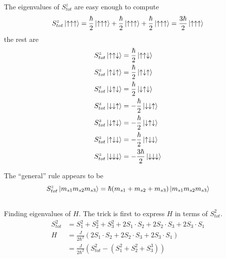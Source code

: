 \documentclass{article}
\begin{document}
The eigenvalues of $S^z_{tot}$ are easy enough to compute
\begin{equation*}
S^z_{tot}\ket{\uparrow\uparrow\uparrow}=\frac{\hbar}{2}\ket{\uparrow\uparrow\uparrow}+\frac{\hbar}{2}\ket{\uparrow\uparrow\uparrow} + \frac{\hbar}{2}\ket{\uparrow\uparrow\uparrow} = \frac{3\hbar}{2}\ket{\uparrow\uparrow\uparrow}
\end{equation*}
the rest are
\begin{align*}
S^z_{tot}\ket{\uparrow\uparrow\downarrow}&=\frac{\hbar}{2}\ket{\uparrow\uparrow\downarrow} \\
S^z_{tot}\ket{\uparrow\downarrow\uparrow}&=\frac{\hbar}{2}\ket{\uparrow\downarrow\uparrow} \\
S^z_{tot}\ket{\downarrow\uparrow\downarrow}&=\frac{\hbar}{2}\ket{\downarrow\uparrow\downarrow} \\
S^z_{tot}\ket{\downarrow\downarrow\uparrow}&=-\frac{\hbar}{2}\ket{\downarrow\downarrow\uparrow} \\
S^z_{tot}\ket{\downarrow\uparrow\downarrow}&=-\frac{\hbar}{2}\ket{\downarrow\uparrow\downarrow} \\
S^z_{tot}\ket{\uparrow\downarrow\downarrow}&=-\frac{\hbar}{2}\ket{\uparrow\downarrow\downarrow} \\
S^z_{tot}\ket{\downarrow\downarrow\downarrow}&=-\frac{3\hbar}{2}\ket{\downarrow\downarrow\downarrow} 
\end{align*}

The ``general'' rule appears to be
\begin{equation}
S^z_{tot}\ket{m_{s1}m_{s2}m_{s3}}=\hbar (m_{s1}+m_{s2}+m_{s3})\ket{m_{s1}m_{s2}m_{s3}}
\end{equation}


\subsection{}
Finding eigenvalues of $H$. The trick is first to express $H$ in terms of $S_{tot}^2$.
\begin{align*}
S_{tot}^2 &= S_1^2 + S_2^2 + S_3^2 + 2S_1\cdot S_2 + 2S_2\cdot S_3 + 2S_3\cdot S_1 \\
H &= \frac{J}{2\hbar^2}(2S_1\cdot S_2 + 2S_2\cdot S_3 + 2S_3\cdot S_1) \\
  &= \frac{J}{2\hbar^2}(S_{tot}^2-(S_1^2+S_2^2+S_3^3))
\end{align*}
\end{document}
